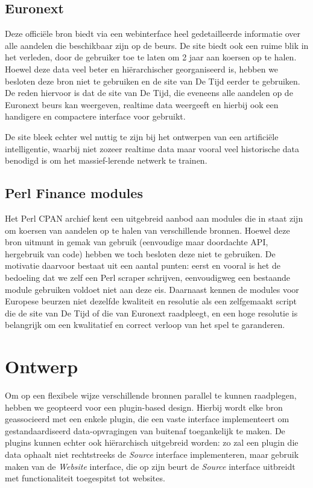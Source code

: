 \subsection{Euronext}

Deze offici\"ele bron biedt via een webinterface heel gedetailleerde informatie over alle aandelen die beschikbaar zijn op de beurs. De site biedt ook een ruime blik in het verleden, door de gebruiker toe te laten om 2 jaar aan koersen op te halen. Hoewel deze data veel beter en hi\"erarchischer georganiseerd is, hebben we besloten deze bron niet te gebruiken en de site van De Tijd eerder te gebruiken. De reden hiervoor is dat de site van De Tijd, die eveneens alle aandelen op de Euronext beurs kan weergeven, realtime data weergeeft en hierbij ook een handigere en compactere interface voor gebruikt.

De site bleek echter wel nuttig te zijn bij het ontwerpen van een artifici\"ele intelligentie, waarbij niet zozeer realtime data maar vooral veel historische data benodigd is om het massief-lerende netwerk te trainen.

\subsection{Perl Finance modules}

Het Perl CPAN archief kent een uitgebreid aanbod aan modules die in staat zijn om koersen van aandelen op te halen van verschillende bronnen. Hoewel deze bron uitmunt in gemak van gebruik (eenvoudige maar doordachte API, hergebruik van code) hebben we toch besloten deze niet te gebruiken. De motivatie daarvoor bestaat uit een aantal punten: eerst en vooral is het de bedoeling dat we zelf een Perl scraper schrijven, eenvoudigweg een bestaande module gebruiken voldoet niet aan deze eis. Daarnaast kennen de modules voor Europese beurzen niet dezelfde kwaliteit en resolutie als een zelfgemaakt script die de site van De Tijd of die van Euronext raadpleegt, en een hoge resolutie is belangrijk om een kwalitatief en correct verloop van het spel te garanderen.

\section{Ontwerp}

Om op een flexibele wijze verschillende bronnen parallel te kunnen raadplegen, hebben we geopteerd voor een plugin-based design. Hierbij wordt elke bron geassocieerd met een enkele plugin, die een vaste interface implementeert om gestandaardiseerd data-opvragingen van buitenaf toegankelijk te maken. De plugins kunnen echter ook hi\"erarchisch uitgebreid worden: zo zal een plugin die data ophaalt niet rechtstreeks de \emph{Source} interface implementeren, maar gebruik maken van de \emph{Website} interface, die op zijn beurt de \emph{Source} interface uitbreidt met functionaliteit toegespitst tot websites.

